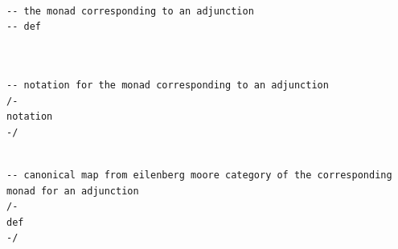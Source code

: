 \documentclass{book}
\newcounter{lcounter}
\begin{document}
\begin{center}
\begin{tcolorbox}[width=5in,colback={white},title={\begin{center}\texttt{Lean \thelcounter} \addtocounter{lcounter}{1}  \end{center}},colbacktitle=Blue,coltitle=black]
\begin{verbatim}

-- the monad corresponding to an adjunction
-- def 


\end{verbatim}%
\end{tcolorbox}
\end{center}



\begin{center}
\begin{tcolorbox}[width=5in,colback={white},title={\begin{center}\texttt{Lean \thelcounter} \addtocounter{lcounter}{1}  \end{center}},colbacktitle=Blue,coltitle=black]
\begin{verbatim}

-- notation for the monad corresponding to an adjunction
/-
notation
-/

\end{verbatim}%
\end{tcolorbox}
\end{center}



\begin{center}
\begin{tcolorbox}[width=5in,colback={white},title={\begin{center}\texttt{Lean \thelcounter} \addtocounter{lcounter}{1}  \end{center}},colbacktitle=Blue,coltitle=black]
\begin{verbatim}

-- canonical map from eilenberg moore category of the corresponding monad for an adjunction
/-
def
-/

\end{verbatim}%
\end{tcolorbox}
\end{center}
\end{document}
